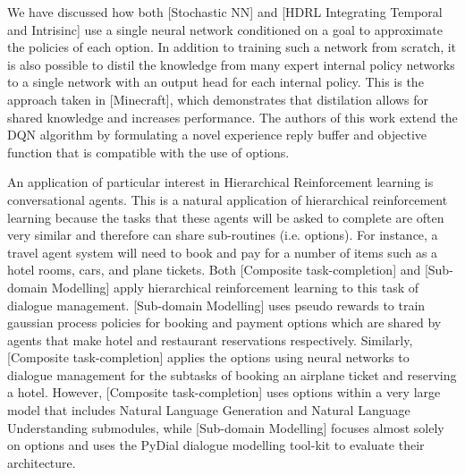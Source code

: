 We have discussed how both [Stochastic NN] and [HDRL Integrating Temporal and Intrisinc]
use a single neural network conditioned on a goal to approximate the policies of each option.
In addition to training such a network from scratch, it is also possible to distil
the knowledge from many expert internal policy networks to a single network with an
output head for each internal policy. This is the approach taken in [Minecraft], which
demonstrates that distilation allows for shared knowledge and increases performance.
The authors of this work extend the DQN algorithm by formulating a novel
experience reply buffer and objective function that is compatible with the use
of options.

An application of particular interest in Hierarchical Reinforcement learning
is conversational agents. This is a natural application of hierarchical
reinforcement learning because the tasks that these agents will be asked
to complete are often very similar and therefore can share sub-routines
(i.e. options). For instance, a travel agent system will need to book
and pay for a number of items such as a hotel rooms, cars, and plane tickets.
Both [Composite task-completion] and [Sub-domain Modelling] apply hierarchical
reinforcement learning to this task of dialogue management. [Sub-domain Modelling]
uses pseudo rewards to train gaussian process policies for booking and payment options
which are shared by agents that make hotel and restaurant reservations respectively.
Similarly, [Composite task-completion] applies the options using neural networks
to dialogue management for the subtasks of booking an airplane ticket and reserving a hotel.
However, [Composite task-completion] uses options within a very large model that
includes Natural Language Generation and Natural Language Understanding
submodules, while [Sub-domain Modelling] focuses almost solely on options and
uses the PyDial dialogue modelling tool-kit to evaluate their architecture.



